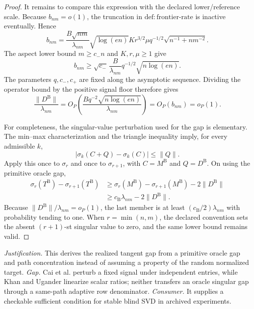\documentclass{article}
\begin{document}
\begin{proof}
It remains to compare this expression with the declared lower/reference scale.  Because \(b_{nm}=o(1)\), the truncation in \(\mathrm{def:frontier\mbox{-}rate}\) is inactive eventually.  Hence
\[
 b_{nm}=\frac{B\sqrt{nm}}{\lambda_{nm}}\sqrt{\log(en)}
 K r^{3/2}\mu q^{-1/2}\sqrt{n^{-1}+nm^{-2}}.
\]
The aspect lower bound \(m\ge c_-n\) and \(K,r,\mu\ge1\) give
\[
 b_{nm}\ge
 \sqrt{c_-}\,\frac{B}{\lambda_{nm}}q^{-1/2}
 \sqrt{n\log(en)}.
\]
The parameters \(q,c_-,c_+\) are fixed along the asymptotic sequence.  Dividing the operator bound by the positive signal floor therefore gives
\[
 \frac{\lVert D^{\mathrm B}\rVert}{\lambda_{nm}}
 =O_P\!\left(\frac{Bq^{-2}\sqrt{n\log(en)}}{\lambda_{nm}}\right)
 =O_P(b_{nm})=o_P(1).
\]

For completeness, the singular-value perturbation used for the gap is elementary.  The min--max characterization and the triangle inequality imply, for every admissible \(k\),
\[
 |\sigma_k(C+Q)-\sigma_k(C)|\le\lVert Q\rVert.
\]
Apply this once to \(\sigma_r\) and once to \(\sigma_{r+1}\), with \(C=M^{\mathrm B}\) and \(Q=D^{\mathrm B}\).  On using the primitive oracle gap,
\[
 \begin{aligned}
 \sigma_r(T^{\mathrm B})-\sigma_{r+1}(T^{\mathrm B})
 &\ge \sigma_r(M^{\mathrm B})-\sigma_{r+1}(M^{\mathrm B})
      -2\lVert D^{\mathrm B}\rVert\\
 &\ge c_{\mathrm B}\lambda_{nm}-2\lVert D^{\mathrm B}\rVert.
 \end{aligned}
\]
Because \(\lVert D^{\mathrm B}\rVert/\lambda_{nm}=o_P(1)\), the last member is at least \((c_{\mathrm B}/2)\lambda_{nm}\) with probability tending to one.  When \(r=\min(n,m)\), the declared convention sets the absent \((r+1)\)-st singular value to zero, and the same lower bound remains valid.
\end{proof}
\par\smallskip\noindent \textit{Justification.} This derives the realized tangent gap from a primitive oracle gap and path concentration instead of assuming a property of the random normalized target. \textit{Gap.} Cai et al. perturb a fixed signal under independent entries, while Khan and Ugander linearize scalar ratios; neither transfers an oracle singular gap through a same-path adaptive row denominator. \textit{Consumer.} It supplies a checkable sufficient condition for stable blind SVD in archived experiments.
\end{document}
